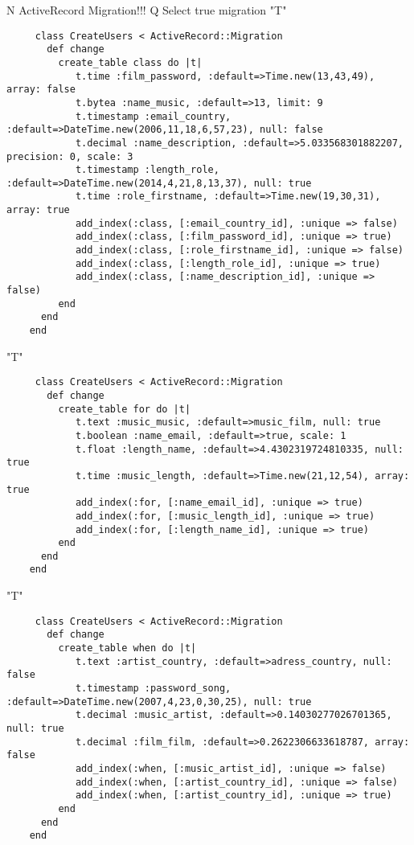 N
ActiveRecord Migration!!!
Q
Select true migration
  "T"
	\begin{verbatim}
   	 class CreateUsers < ActiveRecord::Migration
	   def change
	     create_table class do |t|
			t.time :film_password, :default=>Time.new(13,43,49), array: false
   			t.bytea :name_music, :default=>13, limit: 9
   			t.timestamp :email_country, :default=>DateTime.new(2006,11,18,6,57,23), null: false
   			t.decimal :name_description, :default=>5.033568301882207, precision: 0, scale: 3
   			t.timestamp :length_role, :default=>DateTime.new(2014,4,21,8,13,37), null: true
   			t.time :role_firstname, :default=>Time.new(19,30,31), array: true
   			add_index(:class, [:email_country_id], :unique => false)
			add_index(:class, [:film_password_id], :unique => true)
			add_index(:class, [:role_firstname_id], :unique => false)
			add_index(:class, [:length_role_id], :unique => true)
			add_index(:class, [:name_description_id], :unique => false)
	     end
	  end 
    end
    \end{verbatim}

  "T"
	\begin{verbatim}
   	 class CreateUsers < ActiveRecord::Migration
	   def change
	     create_table for do |t|
			t.text :music_music, :default=>music_film, null: true
   			t.boolean :name_email, :default=>true, scale: 1
   			t.float :length_name, :default=>4.4302319724810335, null: true
   			t.time :music_length, :default=>Time.new(21,12,54), array: true
   			add_index(:for, [:name_email_id], :unique => true)
			add_index(:for, [:music_length_id], :unique => true)
			add_index(:for, [:length_name_id], :unique => true)
	     end
	  end 
    end
    \end{verbatim}

  "T"
	\begin{verbatim}
   	 class CreateUsers < ActiveRecord::Migration
	   def change
	     create_table when do |t|
			t.text :artist_country, :default=>adress_country, null: false
   			t.timestamp :password_song, :default=>DateTime.new(2007,4,23,0,30,25), null: true
   			t.decimal :music_artist, :default=>0.14030277026701365, null: true
   			t.decimal :film_film, :default=>0.2622306633618787, array: false
   			add_index(:when, [:music_artist_id], :unique => false)
			add_index(:when, [:artist_country_id], :unique => false)
			add_index(:when, [:artist_country_id], :unique => true)
	     end
	  end 
    end
    \end{verbatim}

